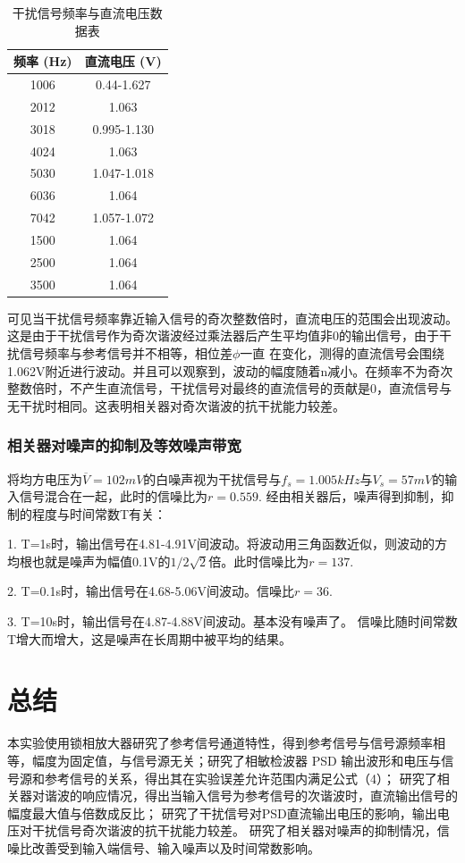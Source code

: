 \documentclass[12pt,a4paper]{article}
\begin{document}
\begin{table}[h]
\centering
\begin{tabular}{|c|c|}
\hline
\textbf{频率 (Hz)} & \textbf{直流电压 (V)} \\
\hline
1006 & 0.44-1.627 \\
2012 & 1.063 \\
3018 & 0.995-1.130 \\
4024 & 1.063 \\
5030 & 1.047-1.018 \\
6036 & 1.064 \\
7042 & 1.057-1.072 \\
1500 & 1.064 \\
2500 & 1.064 \\
3500 & 1.064 \\
\hline
\end{tabular}
\caption{干扰信号频率与直流电压数据表}
\label{tab:frequency-voltage-data}
\end{table}
可见当干扰信号频率靠近输入信号的奇次整数倍时，直流电压的范围会出现波动。这是由于干扰信号作为奇次谐波经过乘法器后产生平均值非0的输出信号，由于干扰信号频率与参考信号并不相等，相位差$\phi$一直
在变化，测得的直流信号会围绕1.062V附近进行波动。并且可以观察到，波动的幅度随着n减小。在频率不为奇次整数倍时，不产生直流信号，干扰信号对最终的直流信号的贡献是0，直流信号与无干扰时相同。这表明相关器对奇次谐波的抗干扰能力较差。

\subsubsection{相关器对噪声的抑制及等效噪声带宽}
将均方电压为$\overline{V}=102mV$的白噪声视为干扰信号与$f_s=1.005kHz$与$V_s=57mV$的输入信号混合在一起，此时的信噪比为$r=0.559$. 
经由相关器后，噪声得到抑制，抑制的程度与时间常数T有关：

1. T=1s时，输出信号在4.81-4.91V间波动。将波动用三角函数近似，则波动的方均根也就是噪声为幅值0.1V的$1/2\sqrt{2}$倍。此时信噪比为$r=137$.

2. T=0.1s时，输出信号在4.68-5.06V间波动。信噪比$r=36$.

3. T=10s时，输出信号在4.87-4.88V间波动。基本没有噪声了。
信噪比随时间常数T增大而增大，这是噪声在长周期中被平均的结果。
\section{总结}
本实验使用锁相放大器研究了参考信号通道特性，得到参考信号与信号源频率相等，幅度为固定值，与信号源无关；研究了相敏检波器 PSD 输出波形和电压与信号源和参考信号的关系，得出其在实验误差允许范围内满足公式（4）；
研究了相关器对谐波的响应情况，得出当输入信号为参考信号的次谐波时，直流输出信号的幅度最大值与倍数成反比；
研究了干扰信号对PSD直流输出电压的影响，输出电压对干扰信号奇次谐波的抗干扰能力较差。
研究了相关器对噪声的抑制情况，信噪比改善受到输入端信号、输入噪声以及时间常数影响。
\end{document}

